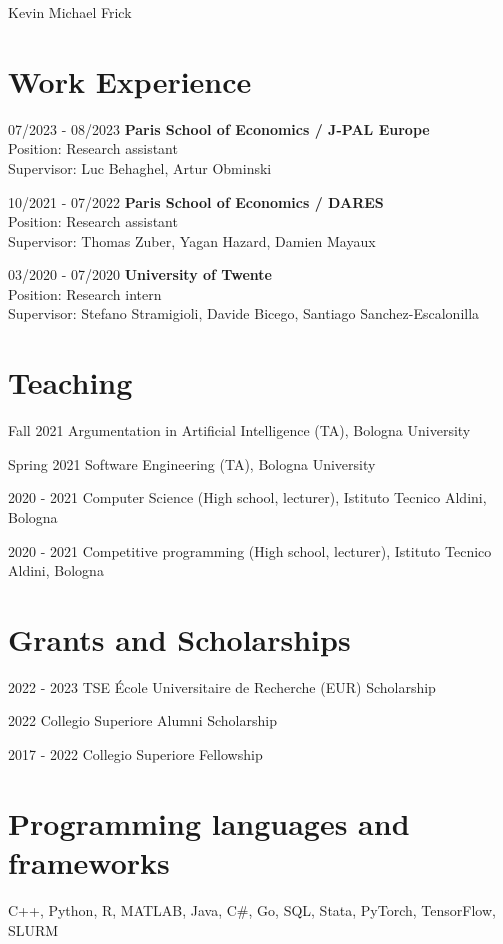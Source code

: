 \documentclass[11pt,a4paper]{article}
\begin{document}
\begin{cv}{\huge Kevin Michael Frick}
\section*{Work Experience}
\begin{cvlist}{}
	\item[07/2023 - 08/2023]
		\textbf{Paris School of Economics / J-PAL Europe}\\
		Position: Research assistant\\
		Supervisor: Luc Behaghel, Artur Obminski
	\item[10/2021 - 07/2022]
    \textbf{Paris School of Economics / DARES}\\
		Position: Research assistant\\
		Supervisor: Thomas Zuber, Yagan Hazard, Damien Mayaux
	\item[03/2020 - 07/2020]
		\textbf{University of Twente}\\
		Position: Research intern\\
		Supervisor: Stefano Stramigioli, Davide Bicego, Santiago Sanchez-Escalonilla
\end{cvlist}
\vspace{-22pt}
  \section*{Teaching}
  \begin{cvlist}{}
  \itemsep -4pt
  \item[Fall 2021] Argumentation in Artificial Intelligence (TA), Bologna University
  \item[Spring 2021] Software Engineering (TA), Bologna University
  \item[2020 - 2021] Computer Science (High school, lecturer), Istituto Tecnico Aldini, Bologna
  \item[2020 - 2021] Competitive programming (High school, lecturer), Istituto Tecnico Aldini, Bologna
  \end{cvlist}
  \vspace{-22pt}
\section*{Grants and Scholarships}
\begin{cvlist}{}
	\itemsep -4pt
	\item[2022 - 2023] TSE École Universitaire de Recherche (EUR) Scholarship
	\item[2022] Collegio Superiore Alumni Scholarship
	\item[2017 - 2022] Collegio Superiore Fellowship
\end{cvlist}
\vspace{-22pt}
\section*{Programming languages and frameworks}
    C++, Python, R, MATLAB, Java, C\#, Go, SQL, Stata, PyTorch, TensorFlow, SLURM
\end{cv}
\end{document}
